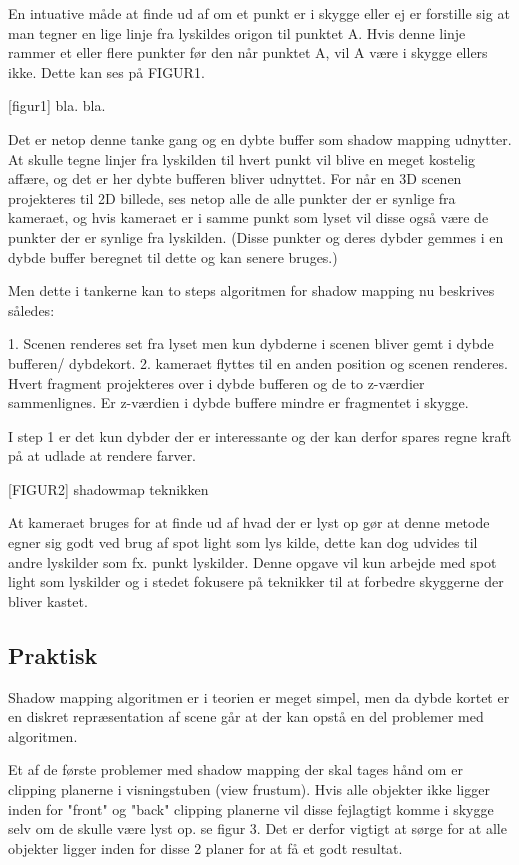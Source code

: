 \documentclass[11pt,a4paper]{article}
\begin{document}
En intuative måde at finde ud af om et punkt er i skygge eller ej er forstille sig at man tegner en lige linje fra lyskildes origon til punktet A. Hvis denne linje rammer et eller flere punkter før den når punktet A, vil A være i  skygge ellers ikke. Dette kan ses på FIGUR1.

[figur1]
bla. bla.

Det er netop denne tanke gang og en dybte buffer som shadow mapping udnytter. At skulle tegne linjer fra lyskilden til hvert punkt vil blive en meget kostelig affære, og det er her dybte bufferen bliver udnyttet. For når en 3D scenen projekteres til 2D billede, ses netop alle de alle punkter der er synlige fra kameraet, og hvis kameraet er i samme punkt som lyset vil disse også være de punkter der er synlige fra lyskilden. (Disse punkter og deres dybder gemmes i en dybde buffer beregnet til dette og kan senere bruges.)

Men dette i tankerne kan to steps algoritmen for shadow mapping nu beskrives således:

1. Scenen renderes set fra lyset men kun dybderne i scenen bliver gemt i dybde bufferen/ dybdekort.
2. kameraet flyttes til en anden position og scenen renderes. Hvert fragment projekteres over i dybde bufferen og de to z-værdier sammenlignes. Er z-værdien i dybde buffere mindre er fragmentet i skygge.

I step 1 er det kun dybder der er interessante og der kan derfor spares regne kraft på at udlade at rendere farver.

[FIGUR2] shadowmap teknikken


At kameraet bruges for at finde ud af hvad der er lyst op gør at denne metode egner sig godt ved brug af spot light som lys kilde, dette kan dog udvides til andre lyskilder som fx. punkt lyskilder. Denne opgave vil kun arbejde med spot light som lyskilder og i stedet fokusere på teknikker til at forbedre skyggerne der bliver kastet.  


\subsection{Praktisk}


Shadow mapping algoritmen er i teorien er meget simpel, men da dybde kortet er en diskret repræsentation af scene går at der kan opstå en del problemer med algoritmen. 

Et af de første problemer med shadow mapping der skal tages hånd om er clipping planerne i visningstuben (view frustum). Hvis alle objekter ikke ligger inden for "front"  og "back" clipping planerne vil disse fejlagtigt komme i skygge selv om de skulle være lyst op. se figur 3. Det er derfor vigtigt at sørge for at alle objekter ligger inden for disse 2 planer for at få et godt resultat. 
\end{document}
